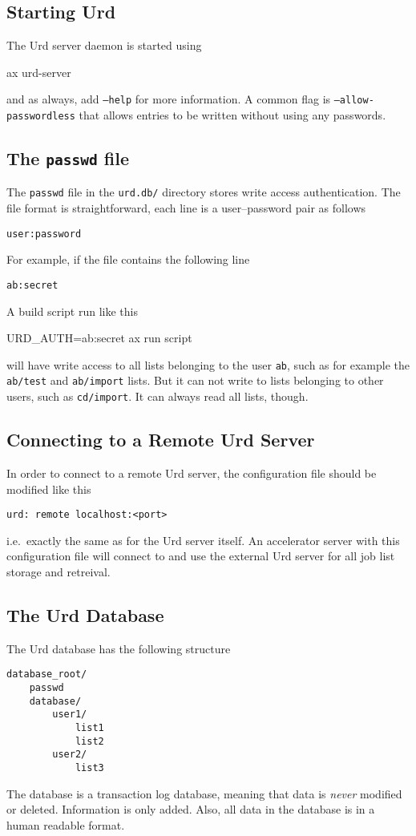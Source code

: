 \subsection{Starting Urd}
The Urd server daemon is started using
\begin{shell}
ax urd-server
\end{shell}
and as always, add \texttt{--help} for more information.  A common
flag is \texttt{--allow-passwordless} that allows entries to be
written without using any passwords.



\subsection{The \texttt{passwd} file}
\label{sec:urdpasswd}
The \texttt{passwd} file in the \texttt{urd.db/} directory stores write access authentication.  The file
format is straightforward, each line is a user--password pair as follows
\begin{verbatim}
user:password
\end{verbatim}
For example, if the file contains the following line
\begin{verbatim}
ab:secret
\end{verbatim}
A build script run like this
\begin{shell}
URD_AUTH=ab:secret ax run script
\end{shell}
will have write access to all lists belonging to the user \texttt{ab},
such as for example the \texttt{ab/test} and \texttt{ab/import} lists.
But it can not write to lists belonging to other users, such as
\texttt{cd/import}.  It can always read all lists, though.



\subsection{Connecting to a Remote Urd Server}
In order to connect to a remote Urd server, the configuration file
should be modified like this
\begin{verbatim}
urd: remote localhost:<port>
\end{verbatim}
i.e.\ exactly the same as for the Urd server itself.  An accelerator
server with this configuration file will connect to and use the
external Urd server for all job list storage and retreival.



\subsection{The Urd Database}
The Urd database has the following structure
\begin{verbatim}
database_root/
    passwd
    database/
        user1/
            list1
            list2
        user2/
            list3
\end{verbatim}
The database is a transaction log database, meaning that data is
\textsl{never} modified or deleted.  Information is only added.
Also, all data in the database is in a human readable format.



